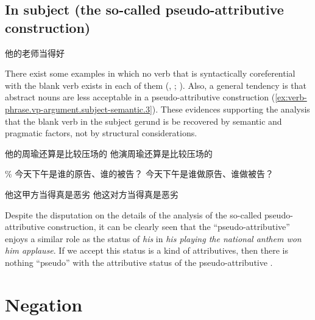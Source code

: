 \documentclass[UTF8, a4paper, oneside, scheme=plain, 12pt]{ctexrep}
\newcommand*{\citepage}[1]{p.~{#1}}
\newcommand{\form}[1]{\emph{#1}}
\begin{document}
\subsection{In subject (the so-called pseudo-attributive construction)}

\begin{exe}
    \ex 他的老师当得好
\end{exe}

There exist some examples in which no verb that is syntactically coreferential with the 
blank verb exists in each of them
(,
; 
\citealt[\citepage{239}]{deng2010formal}).
Also, a general tendency is that abstract nouns are less acceptable 
in a pseudo-attributive construction 
(\ref{ex:verb-phrase.vp-argument.subject-semantic.3}).
These evidences supporting the analysis that the blank verb in the subject gerund 
is be recovered by semantic and pragmatic factors, 
not by structural considerations.

\begin{exe}
    \ex\label{ex:verb-phrase.vp-argument.subject-semantic.1} 
    \begin{xlist}
        \ex 他的周瑜还算是比较压场的
        \ex 他演周瑜还算是比较压场的
    \end{xlist}
    \ex\label{ex:verb-phrase.vp-argument.subject-semantic.2} 
    \begin{xlist}
        \ex \% 今天下午是谁的原告、谁的被告？
        \ex 今天下午是谁做原告、谁做被告？
    \end{xlist}
    \ex\label{ex:verb-phrase.vp-argument.subject-semantic.3} \begin{xlist}
        \ex 他这甲方当得真是恶劣 
        \ex *他这对方当得真是恶劣
    \end{xlist} 
\end{exe}

Despite the disputation on the details of the analysis 
of the so-called pseudo-attributive construction,
it can be clearly seen that 
the ``pseudo-attributive'' enjoys a similar role 
as the status of \form{his} in \form{his playing the national anthem won him applause}.
If we accept this status is a kind of attributives, 
then there is nothing ``pseudo''
with the attributive status of the pseudo-attributive
\citep[\citepage{242}]{deng2010formal}.

\section{Negation}
\end{document}
